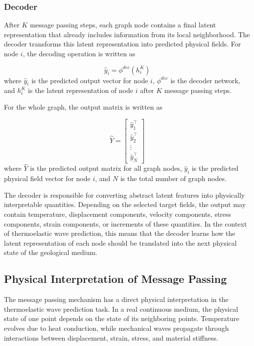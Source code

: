 \subsubsection{Decoder}

After \(K\) message passing steps, each graph node contains a final latent representation that already includes information from its local neighborhood. The decoder transforms this latent representation into predicted physical fields. For node \(i\), the decoding operation is written as

\begin{equation}
\hat{y}_i
=
\phi^{dec}
\left(
h_i^K
\right)
\end{equation}
where \(\hat{y}_i\) is the predicted output vector for node \(i\), \(\phi^{dec}\) is the decoder network, and \(h_i^K\) is the latent representation of node \(i\) after \(K\) message passing steps.

For the whole graph, the output matrix is written as

\begin{equation}
\hat{Y}
=
\begin{bmatrix}
\hat{y}_1^{\top} \\
\hat{y}_2^{\top} \\
\vdots \\
\hat{y}_N^{\top}
\end{bmatrix}
\end{equation}
where \(\hat{Y}\) is the predicted output matrix for all graph nodes, \(\hat{y}_i\) is the predicted physical field vector for node \(i\), and \(N\) is the total number of graph nodes.

The decoder is responsible for converting abstract latent features into physically interpretable quantities. Depending on the selected target fields, the output may contain temperature, displacement components, velocity components, stress components, strain components, or increments of these quantities. In the context of thermoelastic wave prediction, this means that the decoder learns how the latent representation of each node should be translated into the next physical state of the geological medium.

\subsection{Physical Interpretation of Message Passing}

The message passing mechanism has a direct physical interpretation in the thermoelastic wave prediction task. In a real continuous medium, the physical state of one point depends on the state of its neighboring points. Temperature evolves due to heat conduction, while mechanical waves propagate through interactions between displacement, strain, stress, and material stiffness.

